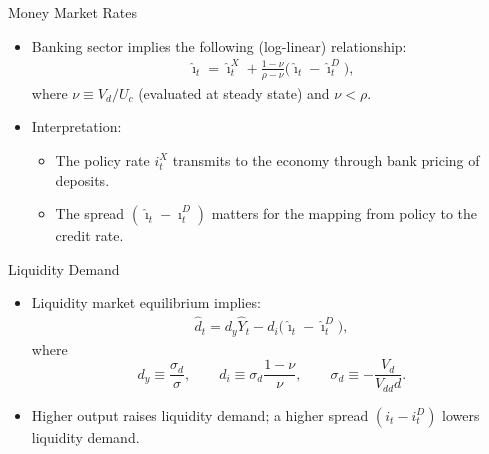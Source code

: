 \documentclass[11pt,aspectratio=169]{beamer}
\begin{document}
\begin{frame}[label=Rate Mapping]{Money Market Rates}
\begin{itemize}
  \item Banking sector implies the following (log-linear) relationship:
  \begin{align}
    \hat\imath_t
    = \hat\imath_t^X
      + \frac{1-\nu}{\rho-\nu}\big(\hat\imath_t-\hat\imath_t^D\big),
    \label{8.22}
  \end{align}
  where $\nu \equiv V_d/U_c$ (evaluated at steady state) and $\nu<\rho$.
  \item Interpretation:
  \begin{itemize}
    \item The policy rate $i_t^X$ transmits to the economy through bank pricing of deposits.
    \item The spread $(\hat\imath_t-\hat\imath_t^D)$ matters for the mapping from policy to the credit rate.
  \end{itemize}
\end{itemize}
\vspace{0.1cm}
\begin{center}
\hyperlink{Appendix H}{}
\end{center}
\end{frame}

\begin{frame}{Liquidity Demand}
\begin{itemize}
  \item Liquidity market equilibrium implies:
  \begin{align}
    \hat d_t
    = d_y \hat Y_t
      - d_i\big(\hat\imath_t-\hat\imath_t^D\big),
    \label{8.23}
  \end{align}
  where
  \[
    d_y \equiv \frac{\sigma_d}{\sigma},\qquad
    d_i \equiv \sigma_d\frac{1-\nu}{\nu},\qquad
    \sigma_d \equiv -\frac{V_d}{V_{dd}d}.
  \]
  \item Higher output raises liquidity demand; a higher spread $(i_t-i_t^D)$ lowers liquidity demand.
\end{itemize}
\end{frame}
\end{document}
